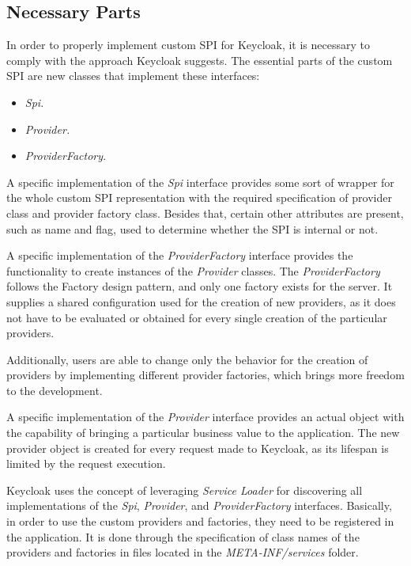 \subsection{Necessary Parts}
In order to properly implement custom SPI for Keycloak, it is necessary to comply with the approach Keycloak suggests.
The essential parts of the custom SPI are new classes that implement these interfaces:
\begin{itemize}
    \item \textit{Spi.}
    \item \textit{Provider.}
    \item \textit{ProviderFactory.}
\end{itemize}

A specific implementation of the \textit{Spi} interface provides some sort of wrapper for the whole custom SPI representation with the required specification of provider class and provider factory class.
Besides that, certain other attributes are present, such as name and flag, used to determine whether the SPI is internal or not.

A specific implementation of the \textit{ProviderFactory} interface provides the functionality to create instances of the \textit{Provider} classes.
The \textit{ProviderFactory} follows the Factory design pattern, and only one factory exists for the server.
It supplies a shared configuration used for the creation of new providers, as it does not have to be evaluated or obtained for every single creation of the particular providers.

Additionally, users are able to change only the behavior for the creation of providers by implementing different provider factories, which brings more freedom to the development.

A specific implementation of the \textit{Provider} interface provides an actual object with the capability of bringing a particular business value to the application.
The new provider object is created for every request made to Keycloak, as its lifespan is limited by the request execution.

Keycloak uses the concept of leveraging \textit{Service Loader} for discovering all implementations of the \textit{Spi}, \textit{Provider}, and \textit{ProviderFactory} interfaces.
Basically, in order to use the custom providers and factories, they need to be registered in the application.
It is done through the specification of class names of the providers and factories in files located in the \textit{META-INF/services} folder.

